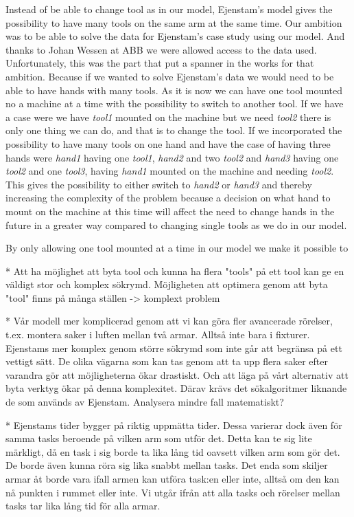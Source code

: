 Instead of be able to change tool as in our model, Ejenstam's model gives the possibility to have many tools on the same arm at the same time. Our ambition was to be able to solve the data for Ejenstam's case study using our model. And thanks to Johan Wessen at ABB we were allowed access to the data used. Unfortunately, this was the part that put a spanner in the works for that ambition. Because if we wanted to solve Ejenstam's data we would need to be able to have hands with many tools. As it is now we can have one tool mounted no a machine at a time with the possibility to switch to another tool. If we have a case were we have \emph{tool1} mounted on the machine but we need \emph{tool2} there is only one thing we can do, and that is to change the tool. If we incorporated the possibility to have many tools on one hand and have the case of having three hands were \emph{hand1} having one \emph{tool1}, \emph{hand2} and two \emph{tool2} and \emph{hand3} having one \emph{tool2} and one \emph{tool3}, having \emph{hand1} mounted on the machine and needing \emph{tool2}. This gives the possibility to either switch to \emph{hand2} or \emph{hand3} and thereby increasing the complexity of the problem because a decision on what hand to mount on the machine at this time will affect the need to change hands in the future in a greater way compared to changing single tools as we do in our model.

By only allowing one tool mounted at a time in our model we make it possible to

* Att ha möjlighet att byta tool och kunna ha flera "tools" på ett tool kan ge en väldigt stor och komplex sökrymd. Möjligheten att optimera genom att byta "tool" finns på många ställen -> komplext problem

* Vår modell mer komplicerad genom att vi kan göra fler avancerade rörelser, t.ex. montera saker i luften mellan två armar. Alltså inte bara i fixturer.
Ejenstams mer komplex genom större sökrymd som inte går att begränsa på ett vettigt sätt. De olika vägarna som kan tas genom att ta upp flera saker efter varandra gör att möjligheterna ökar drastiskt. Och att läga på vårt alternativ att byta verktyg ökar på denna komplexitet. Därav krävs det sökalgoritmer liknande de som används av Ejenstam.
Analysera mindre fall matematiskt?

* Ejenstams tider bygger på riktig uppmätta tider. Dessa varierar dock även för samma tasks beroende på vilken arm som utför det. Detta kan te sig lite märkligt, då en task i sig borde ta lika lång tid oavsett vilken arm som gör det. De borde även kunna röra sig lika snabbt mellan tasks. Det enda som skiljer armar åt borde vara ifall armen kan utföra task:en eller inte, alltså om den kan nå punkten i rummet eller inte.
Vi utgår ifrån att alla tasks och rörelser mellan tasks tar lika lång tid för alla armar.


